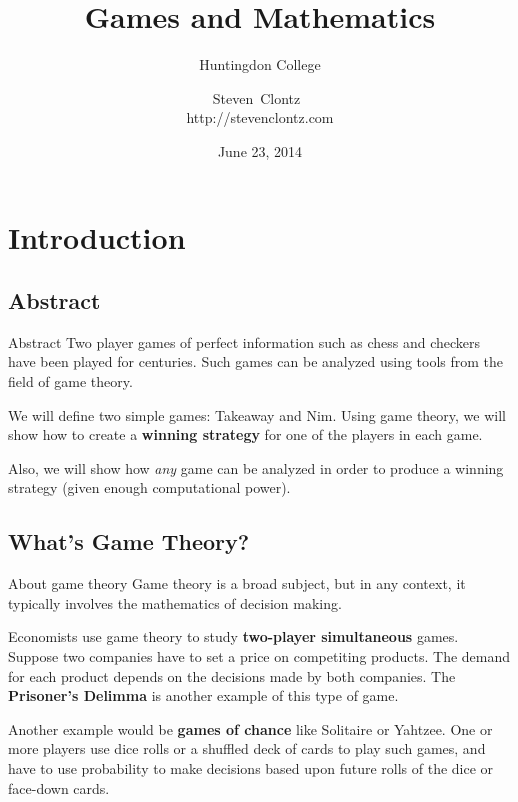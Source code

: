 \documentclass{beamer}
\title
{Games and Mathematics}
\subtitle
{Huntingdon College} %
\author%
{Steven~Clontz~\\http://stevenclontz.com}%
\institute[Auburn University] %
{
  Department of Mathematics and Statistics\\
  Auburn University}
\date[14-06-23] %
{June 23, 2014}
\theoremstyle{theorem}
\theoremstyle{definition}
\newcommand{\<}{\langle}
\renewcommand{\>}{\rangle}
\newcommand{\vpause}{\pause\vspace{1em}}
\newcommand{\term}[1]{\textbf{#1}}
\begin{document}
\renewcommand{\pause}{}

\begin{frame}
  \titlepage
\end{frame}


\section{Introduction}

\subsection{Abstract}

\begin{frame}{Abstract}%
    \small
    Two player games of perfect information such as chess and checkers have
    been played for centuries. Such games can be analyzed using tools from
    the field of game theory.

    \vpause

    We will define two simple games: Takeaway and Nim.
    Using game theory, we will show how to create a \term{winning strategy}
    for one of the players in each game.

    \vpause

    Also, we will show how \textit{any} game can be analyzed in order
    to produce a winning strategy (given enough computational power).
\end{frame}

\subsection{What's Game Theory?}

\begin{frame}{About game theory}
  Game theory is a broad subject, but in any context, it typically involves the
  mathematics of decision making.

  \vpause

  Economists use game theory to study \term{two-player simultaneous}
  games. Suppose two companies have to set a price on competiting products.
  The demand for each product depends on the decisions made by both companies.
  The \term{Prisoner's Delimma} is another example of this type of game.

  \vpause

  Another example would be \term{games of chance} like Solitaire or Yahtzee.
  One or more players use dice rolls or a shuffled deck of cards to play such
  games, and have to use probability to make decisions based upon future rolls
  of the dice or face-down cards.
\end{frame}
\end{document}
